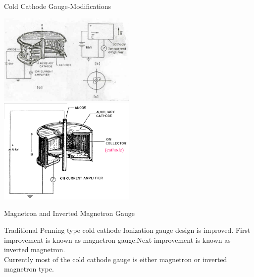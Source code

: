 \documentclass[11pt]{beamer}
\begin{document}
\begin{frame}{Cold Cathode Gauge-Modifications }

       \begin{exampleblock}{}
         \begin{center}
			\includegraphics[width=0.5\textwidth]{MagnetronGauge.png}
			\includegraphics[width=0.5\textwidth]{InvertedMagnetronGauge.png}
		\end{center}
       
       \end{exampleblock}
       
       \begin{exampleblock}{Magnetron and Inverted Magnetron Gauge}
          
        Traditional Penning type cold cathode Ionization gauge design is improved. First improvement is known as magnetron gauge.Next improvement is known as inverted magnetron.\\
        Currently most of the cold cathode gauge is either magnetron or inverted magnetron type.
       
       \end{exampleblock}
       
       
     

\end{frame}
\end{document}
